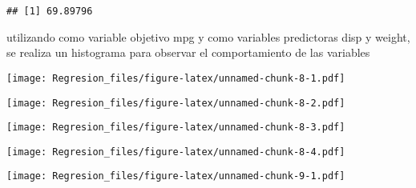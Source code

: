 \documentclass[]{article}
\newenvironment{Shaded}{\begin{snugshade}}{\end{snugshade}}
\newcommand{\KeywordTok}[1]{\textcolor[rgb]{0.13,0.29,0.53}{\textbf{#1}}}
\newcommand{\NormalTok}[1]{#1}
\newcommand{\OperatorTok}[1]{\textcolor[rgb]{0.81,0.36,0.00}{\textbf{#1}}}
\begin{document}
\begin{verbatim}
## [1] 69.89796
\end{verbatim}

utilizando como variable objetivo mpg y como variables predictoras disp
y weight, se realiza un histograma para observar el comportamiento de
las variables

\begin{Shaded}
\end{Shaded}

\texttt{[image: Regresion\_files/figure-latex/unnamed-chunk-8-1.pdf]}

\begin{Shaded}
\end{Shaded}

\texttt{[image: Regresion\_files/figure-latex/unnamed-chunk-8-2.pdf]}

\begin{Shaded}
\end{Shaded}

\texttt{[image: Regresion\_files/figure-latex/unnamed-chunk-8-3.pdf]}

\begin{Shaded}
\end{Shaded}

\texttt{[image: Regresion\_files/figure-latex/unnamed-chunk-8-4.pdf]}

\begin{Shaded}
\end{Shaded}

\texttt{[image: Regresion\_files/figure-latex/unnamed-chunk-9-1.pdf]}
\end{document}
